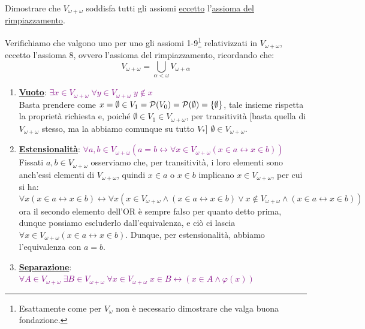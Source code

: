 \begin{exercise}
	Dimostrare che $V_{\omega + \omega}$ soddisfa tutti gli assiomi \underline{eccetto} l'\hyperref[ax8]{assioma del rimpiazzamento}.
\end{exercise}

\begin{soln}
	Verifichiamo che valgono uno per uno gli assiomi 1-9\footnote{Esattamente come per $V_\omega$ non è necessario dimostrare che valga buona fondazione.} relativizzati in $V_{\omega + \omega}$, eccetto l'assioma 8, ovvero l'assioma del rimpiazzamento, ricordando che:
	\[ V_{\omega + \omega} = \bigcup_{\alpha < \omega} V_{\omega + \alpha}
		\]
	\begin{enumerate}[(1)]
		\item \textbf{\underline{Vuoto}}: \textcolor{purple}{$\exists x \in V_{\omega + \omega} \; \forall y \in V_{\omega + \omega} \; y \not \in x$} \\
		Basta prendere come $x = \emptyset \in V_1 = \mathcal{P}(V_0) = \mathcal{P}(\emptyset) = \{\emptyset\}$, tale insieme rispetta la proprietà richiesta e, poiché $\emptyset \in V_1 \in V_{\omega + \omega}$, per transitività [basta quella di $V_{\omega + \omega}$ stesso, ma la abbiamo comunque su tutto $V_*$] $\emptyset \in V_{\omega + \omega}$.
		\item \textbf{\underline{Estensionalità}}: \textcolor{purple}{$\forall a,b \in V_{\omega + \omega} (a = b \leftrightarrow \forall x \in V_{\omega + \omega} (x \in a \leftrightarrow x \in b))$} \\
		Fissati $a,b \in V_{\omega + \omega}$ osserviamo che, per transitività, i loro elementi sono anch'essi elementi di $V_{\omega + \omega}$, quindi $x \in a$ o $x \in b$ implicano $x \in V_{\omega + \omega}$, per cui si ha:
		\[ \forall x (x \in a \leftrightarrow x \in b) \leftrightarrow \forall x (x \in V_{\omega + \omega} \land (x \in a \leftrightarrow x \in b) \lor x \not \in V_{\omega + \omega} \land (x \in a \leftrightarrow x \in b))
			\] 
		ora il secondo elemento dell'OR è sempre falso per quanto detto prima, dunque possiamo escluderlo dall'equivalenza, e ciò ci lascia $\forall x \in V_{\omega + \omega} (x \in a \leftrightarrow x \in b)$.
		Dunque, per estensionalità, abbiamo l'equivalenza con $a = b$.
		\item \textbf{\underline{Separazione}}: \textcolor{purple}{$\forall A \in V_{\omega + \omega} \; \exists B \in V_{\omega + \omega} \; \forall x \in V_{\omega + \omega} \; x \in B \leftrightarrow (x \in A \land \varphi(x))$} \\

\end{enumerate}
\end{soln}
